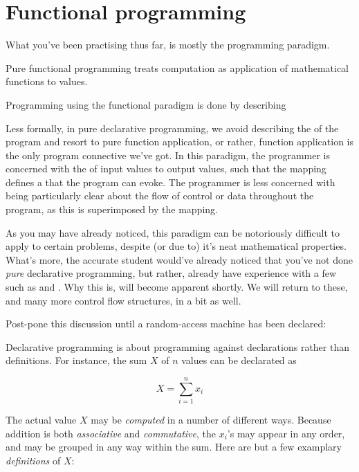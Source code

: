 \section{Functional programming}

What you've been practising thus far, is mostly the 
programming paradigm.

\begin{definition}

Pure functional programming treats computation as application of mathematical
functions to  values.

\end{definition}

Programming using the functional paradigm is done by describing 

Less formally, in pure declarative programming, we avoid describing the
 of the program and resort to pure function application, or rather,
function application is the only program connective we've got.  In this
paradigm, the programmer is concerned with the  of input values to
output values, such that the mapping defines a  that
the program can evoke.  The programmer is less concerned with being
particularly clear about the flow of control or data throughout the program, as
this is superimposed by the mapping.

As you may have already noticed, this paradigm can be notoriously difficult to
apply to certain problems, despite (or due to) it's neat mathematical
properties.  What's more, the accurate student would've already noticed that
you've not done \emph{pure} declarative programming, but rather, already have
experience with a few  such as  and
 .  Why this is, will become
apparent shortly. We will return to these, and many more control flow
structures, in a bit as well.

Post-pone this discussion until a random-access machine has been declared:

Declarative programming is about programming against declarations rather than
definitions. For instance, the sum $X$ of $n$ values can be declarated as

\begin{equation}
X=\sum_{i=1}^n x_i\label{decl:sum}
\end{equation}

The actual value $X$ may be \emph{computed} in a number of different ways.
Because addition is both \emph{associative} and \emph{commutative}, the $x_i$'s
may appear in any order, and may be grouped in any way within the sum. Here are
but a few examplary \emph{definitions} of $X$:

